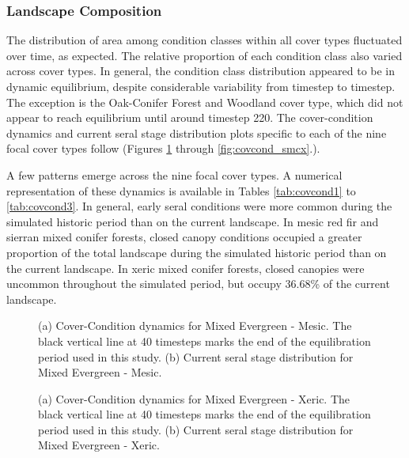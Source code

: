 \subsubsection{Landscape Composition}

The distribution of area among condition classes within all cover types fluctuated over time, as expected. The relative proportion of each condition class also varied across cover types. In general, the condition class distribution appeared to be in dynamic equilibrium, despite considerable variability from timestep to timestep. The exception is the Oak-Conifer Forest and Woodland cover type, which did not appear to reach equilibrium until around timestep 220. The cover-condition dynamics and current seral stage distribution plots specific to each of the nine focal cover types follow (Figures \ref{fig:covcond_megm} through \ref{fig:covcond_smcx}.).

A few patterns emerge across the nine focal cover types. A numerical representation of these dynamics is available in Tables \ref{tab:covcond1} to \ref{tab:covcond3}. In general, early seral conditions were more common during the simulated historic period than on the current landscape. In mesic red fir and sierran mixed conifer forests, closed canopy conditions occupied a greater proportion of the total landscape during the simulated historic period than on the current landscape. In xeric mixed conifer forests, closed canopies were uncommon throughout the simulated period, but occupy 36.68\% of the current landscape.
\begin{figure}[!htbp]
  \centering
  \caption{(a) Cover-Condition dynamics for Mixed Evergreen - Mesic. The black vertical line at 40 timesteps marks the end of the equilibration period used in this study. (b) Current seral stage distribution for Mixed Evergreen - Mesic.}
\label{fig:covcond_megm}
\end{figure}


\begin{figure}[!htbp]
  \centering
  \caption{(a) Cover-Condition dynamics for Mixed Evergreen - Xeric. The black vertical line at 40 timesteps marks the end of the equilibration period used in this study. (b) Current seral stage distribution for Mixed Evergreen - Xeric.} 
  \label{fig:covcond_megx}
\end{figure}

